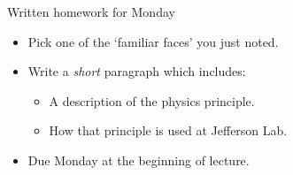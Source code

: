 \documentclass[english]{beamer}
\begin{document}
\begin{frame}{Written homework for Monday}
  \begin{itemize}
    \item Pick one of the `familiar faces' you just noted.
    \item Write a \textit{short} paragraph which includes:
    \begin{itemize}
      \item A description of the physics principle.
      \item How that principle is used at Jefferson Lab.
    \end{itemize}
    \item Due Monday at the beginning of lecture.
  \end{itemize}
\end{frame}
\end{document}
